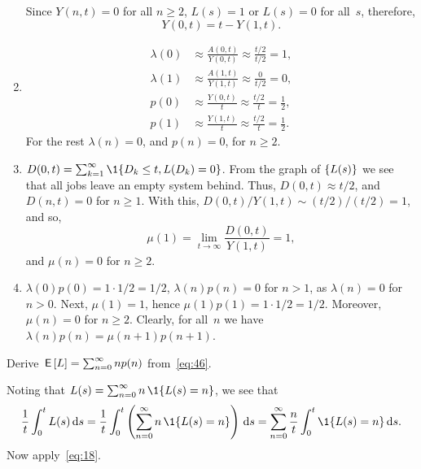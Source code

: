 \documentclass[stochastic-or.tex]{subfiles}
\begin{document}
\begin{exercise}
\begin{solution}
\begin{enumerate}
Since $Y(n,t)=0$ for all $n\geq 2$, $L(s) = 1$ or
 $L(s)=0$ for all~$s$, therefore,
 \begin{equation*}
 Y(0,t) = t-Y(1,t).
 \end{equation*}
 \item
 \begin{align*}
 \lambda(0) &\approx \frac{A(0,t)}{Y(0,t)} \approx \frac{t/2}{t/2} = 1, \\
 \lambda(1) &\approx \frac{A(1,t)}{Y(1,t)} \approx \frac{0}{t/2} = 0, \\
 p(0) &\approx \frac{Y(0,t)}{t} \approx \frac{t/2}{t} = \frac 1 2, \\
 p(1) &\approx \frac{Y(1,t)}{t} \approx \frac{t/2}{t} = \frac 1 2.
 \end{align*}
For the rest $\lambda(n) = 0$, and $p(n)=0$, for $n\geq 2$.
\item
 $D(0,t) = \sum_{k=1}^\infty\1{D_k\leq t, L(D_k)=0}$. From the graph of $\{L(s)\}$ we see that all jobs leave an empty system behind. Thus, $D(0,t) \approx t/2$, and $D(n,t)=0$ for $n\geq 1$. With this, $D(0,t)/Y(1,t) \sim (t/2)/(t/2) = 1$, and so,
 \begin{equation*}
 \mu(1) = \lim_{t\to\infty} \frac{D(0,t)}{Y(1, t)} = 1,
 \end{equation*}
and $\mu(n) = 0$ for $n\geq2$.
\item
 $\lambda(0)p(0)=1\cdot 1/2 = 1/2$, $\lambda(n)p(n)= 0$ for $n>1$, as $\lambda(n)=0$ for $n>0$.
Next, $\mu(1)=1$, hence $\mu(1) p(1) = 1\cdot 1/2 = 1/2$. Moreover, $\mu(n)=0$ for $n\geq 2$.
Clearly, for all~$n$ we have $\lambda(n)p(n)= \mu(n+1)p(n+1)$.
\end{enumerate}
\end{solution}
\end{exercise}

\begin{exercise}\label{ex:l-111}
 Derive $\,\mathsf{E}\left[L\right] = \sum_{n=0}^\infty n p(n)$ from~\cref{eq:46}.
\begin{solution}
Noting that %
$L(s) = \sum_{n=0}^\infty n\, \1{\L(s) = n}$, we see that
\begin{equation*}
\frac 1 t \int_0^t L(s) \d s = \frac 1 t \int_0^t \left(\sum_{n=0}^{\infty} n\, \1{\L(s) = n}\right) \d s
= \sum_{n=0}^{\infty} \frac n t \int_0^t \1{\L(s) = n} \d s.
\end{equation*}
Now apply~\cref{eq:18}.
\end{solution}
\end{exercise}
\end{document}
